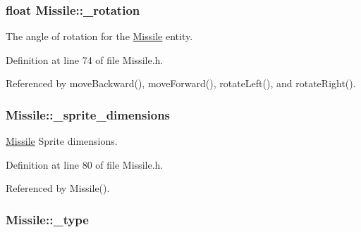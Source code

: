 \hypertarget{classMissile_acd500cfc21ada9701b059cb4a77a5c96}{
\subsubsection[{\-\_\-rotation}]{\setlength{\rightskip}{0pt plus 5cm}float Missile\-::\-\_\-rotation\hspace{0.3cm}{\ttfamily [private]}}}\label{classMissile_acd500cfc21ada9701b059cb4a77a5c96}


The angle of rotation for the \hyperlink{classMissile}{Missile} entity. 



Definition at line 74 of file Missile.\-h.



Referenced by move\-Backward(), move\-Forward(), rotate\-Left(), and rotate\-Right().

\hypertarget{classMissile_a97a02568096e4900a56067e2f2b346fc}{
\subsubsection[{\-\_\-sprite\-\_\-dimensions}]{ Missile\-::\-\_\-sprite\-\_\-dimensions\hspace{0.3cm}{\ttfamily [private]}}}\label{classMissile_a97a02568096e4900a56067e2f2b346fc}


\hyperlink{classMissile}{Missile} Sprite dimensions. 



Definition at line 80 of file Missile.\-h.



Referenced by Missile().

\hypertarget{classMissile_a2cbcb75f29640ba706e64cb620a7c6a7}{
\subsubsection[{\-\_\-type}]{ Missile\-::\-\_\-type\hspace{0.3cm}{\ttfamily [private]}}}\label{classMissile_a2cbcb75f29640ba706e64cb620a7c6a7}


